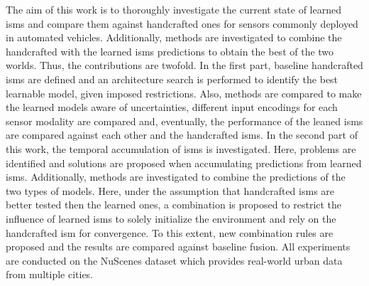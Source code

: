 {The aim of this work is to thoroughly investigate the current state of learned \gls{ism}s and compare them against handcrafted ones for sensors commonly deployed in automated vehicles. Additionally, methods are investigated to combine the handcrafted with the learned \gls{ism}s predictions to obtain the best of the two worlds. Thus, the contributions are twofold. In the first part, baseline handcrafted \gls{ism}s are defined and an architecture search is performed to identify the best learnable model, given imposed restrictions. Also, methods are compared to make the learned models aware of uncertainties, different input encodings for each sensor modality are compared and, eventually, the performance of the leaned \gls{ism}s are compared against each other and the handcrafted \gls{ism}s. In the second part of this work, the temporal accumulation of \gls{ism}s is investigated. Here, problems are identified and solutions are proposed when accumulating predictions from learned \gls{ism}s. Additionally, methods are investigated to combine the predictions of the two types of models. Here, under the assumption that handcrafted \gls{ism}s are better tested then the learned ones, a combination is proposed to restrict the influence of learned \gls{ism}s to solely initialize the environment and rely on the handcrafted \gls{ism} for convergence. To this extent, new combination rules are proposed and the results are compared against baseline fusion. All experiments are conducted on the NuScenes dataset \cite{caesar2020nuscenes} which provides real-world urban data from multiple cities.
%
}

